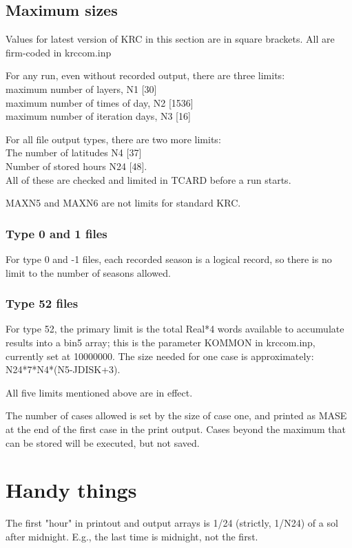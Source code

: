 \documentclass[draft]{article}  %
\newcommand{\qi}{\\ \hspace*{2.em}}      %
\begin{document}
\subsection{Maximum sizes} %
Values for latest version of KRC in this section are in square brackets. All are
firm-coded in krccom.inp

For any run, even without recorded output, there are three limits:
\qi maximum number of layers, N1 [30]  
\qi maximum number of times of day, N2 [1536]
\qi maximum number of iteration days, N3 [16]

For all file output types, there are two more limits:
\qi The number of latitudes N4 [37] 
\qi  Number of stored hours N24 [48]. 
\\ All of these are checked and limited in TCARD before a run starts.

MAXN5 and MAXN6 are not limits for standard KRC.

\subsubsection{Type 0 and 1 files} %
For type 0 and -1 files, each recorded season is a logical record, so there is
no limit to the number of seasons allowed.

\subsubsection{Type 52 files} %

For type 52, the primary limit is the total Real*4 words available to accumulate
results into a bin5 array; this is the parameter KOMMON in krccom.inp, currently
set at 10000000. The size needed for one case is approximately:  
N24*7*N4*(N5-JDISK+3).

All five limits mentioned above are in effect.

The number of cases allowed is set by the size of case one, and printed as MASE
at the end of the first case in the print output. Cases beyond the maximum that
can be stored will be executed, but not saved.

\section{Handy things} %

The first "hour" in printout and output arrays is 1/24 (strictly, 1/N24) of a
sol after midnight. E.g., the last time is midnight, not the first.
\end{document}
